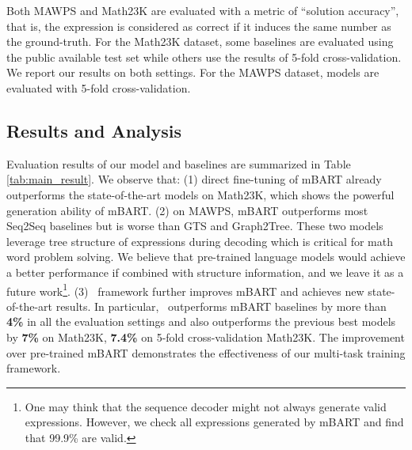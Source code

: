 \vspace{2mm}
 Both MAWPS and Math23K are evaluated with a metric of ``solution accuracy'', that is, the expression is considered as correct if it induces the same number as the ground-truth. For the Math23K dataset, some baselines are evaluated using the public available test set while others use the results of 5-fold cross-validation. We report our results on both settings. For the MAWPS dataset, models are evaluated with 5-fold cross-validation.

\subsection{Results and Analysis}
Evaluation results of our model and baselines are summarized in Table \ref{tab:main_result}. We observe that: (1) direct fine-tuning of mBART already outperforms the state-of-the-art models on Math23K, which shows the powerful generation ability of mBART. (2) on MAWPS, mBART outperforms most Seq2Seq baselines but is worse than GTS and Graph2Tree. These two models leverage tree structure of expressions during decoding which is critical for math word problem solving. We believe that pre-trained language models would achieve a better performance if combined with structure information, and we leave it as a future work\footnote{One may think that the sequence decoder might not always generate valid expressions. However, we check all expressions generated by mBART and find that 99.9\% are valid.}. (3) \method\ framework further improves mBART and achieves new state-of-the-art results. In particular, \method\ outperforms mBART baselines by more than {\bf 4\%} in all the evaluation settings and also outperforms the previous best models by {\bf 7\%} on Math23K, {\bf 7.4\%} on 5-fold cross-validation Math23K. The improvement over pre-trained mBART demonstrates the effectiveness of our multi-task training framework.

